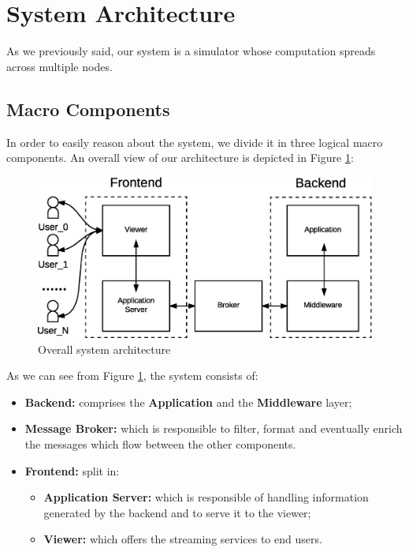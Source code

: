 \section{System Architecture}
As we previously said, our system is a simulator whose computation spreads
across multiple nodes.

\subsection{Macro Components}

In order to easily reason about the system, we
divide it in three logical macro components.
An overall view of our architecture
is depicted in Figure \ref{fig:sd-sys-arch-overall}:

\begin{figure}[H]
  \centering
  \includegraphics[scale=0.5,keepaspectratio]
    {images/solution/overall-arch.eps}
  \caption{Overall system architecture}
  \label{fig:sd-sys-arch-overall}
\end{figure}

As we can see from Figure \ref{fig:sd-sys-arch-overall}, the system consists of:

\begin{itemize}
  \item \textbf{Backend:} comprises the \textbf{Application} and the
    \textbf{Middleware} layer;
  \item \textbf{Message Broker:} which is responsible to filter, format
    and eventually enrich the messages which flow between the other components.
  \item \textbf{Frontend:} split in:
  \begin{itemize}
    \item \textbf{Application Server:} which is responsible of handling
      information generated by the backend and to serve it to the viewer;
    \item \textbf{Viewer:} which offers the streaming services to end users.
  \end{itemize}
\end{itemize}

